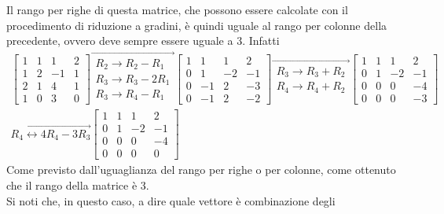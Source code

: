 Il rango per righe di questa matrice, che possono essere calcolate con il
procedimento di riduzione a gradini, è quindi uguale al rango per colonne
della precedente, ovvero deve sempre essere uguale a 3. Infatti
\begin{equation}
  \label{eq:guess-jorda5}
  \begin{matrix}
    \begin{bmatrix}
      1 & 1 & 1& 2\\
      1 & 2 & -1 & 1\\
      2 & 1 & 4 & 1\\
      1 & 0 & 3 & 0
    \end{bmatrix}
    \overrightarrow{
    \begin{matrix}
      R_2\to R_2- R_1\\
      R_3\to R_3-2R_1\\
      R_3\to R_4-R_1
    \end{matrix}
    }
    \begin{bmatrix}
      1 & 1 & 1 & 2\\
      0 & 1 & -2 & -1 \\
      0 & -1 & 2 & -3\\
      0 & -1 & 2 & -2
    \end{bmatrix}
    \overrightarrow{
    \begin{matrix}
      R_3\to R_3+R_2\\
      R_4\to R_4+R_2
    \end{matrix}
    }
    \begin{bmatrix}
      1 & 1 & 1 & 2\\
      0 & 1 & -2 & -1\\
      0 & 0 & 0 & -4\\
      0 & 0 & 0 & -3
    \end{bmatrix}\\
    \overrightarrow{
    R_4\leftrightarrow 4R_4-3R_3}
    \begin{bmatrix}
      1 & 1 & 1 & 2\\
      0 & 1 & -2 & -1\\
      0 & 0 & 0 & -4\\
      0 & 0 & 0 & 0
    \end{bmatrix}
  \end{matrix}
\end{equation}
Come previsto dall'uguaglianza del rango per righe o per colonne, come
ottenuto che il rango della matrice è 3.\\
Si noti che, in questo caso, a dire quale vettore è combinazione degli
